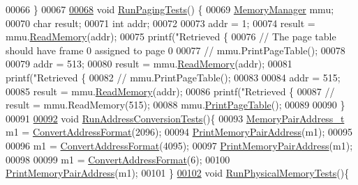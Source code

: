 \begin{DoxyCode}
00066 \}
00067 
\hypertarget{main_8cpp_source.tex_l00068}{}\hyperlink{main_8cpp_a31aaac7e09dbfca2c888cb8e319fcdbd}{00068} \textcolor{keywordtype}{void} \hyperlink{main_8cpp_a31aaac7e09dbfca2c888cb8e319fcdbd}{RunPagingTests}() \{
00069     \hyperlink{classMemoryManager}{MemoryManager} mmu;
00070     \textcolor{keywordtype}{char} result;
00071     \textcolor{keywordtype}{int} addr;
00072 
00073     addr = 1;
00074     result = mmu.\hyperlink{classMemoryManager_a4a716fc46ee321ebb25bd54bcc9d0524}{ReadMemory}(addr);
00075     printf(\textcolor{stringliteral}{"Retrieved \{%
00076     \textcolor{comment}{// The page table should have frame 0 assigned to page 0}
00077     \textcolor{comment}{// mmu.PrintPageTable();}
00078 
00079     addr = 513;
00080     result = mmu.\hyperlink{classMemoryManager_a4a716fc46ee321ebb25bd54bcc9d0524}{ReadMemory}(addr);
00081     printf(\textcolor{stringliteral}{"Retrieved \{%
00082     \textcolor{comment}{// mmu.PrintPageTable();}
00083 
00084     addr = 515;
00085     result = mmu.\hyperlink{classMemoryManager_a4a716fc46ee321ebb25bd54bcc9d0524}{ReadMemory}(addr);
00086     printf(\textcolor{stringliteral}{"Retrieved \{%
00087     \textcolor{comment}{// result = mmu.ReadMemory(515);}
00088     mmu.\hyperlink{classMemoryManager_aa7437efdc1ebd09895d451e2c521857a}{PrintPageTable}();
00089 
00090 \}
00091 
\hypertarget{main_8cpp_source.tex_l00092}{}\hyperlink{main_8cpp_a9d50d2049f7ee3c00984500c882ddde9}{00092} \textcolor{keywordtype}{void} \hyperlink{main_8cpp_a9d50d2049f7ee3c00984500c882ddde9}{RunAddressConversionTests}()\{ 
00093     \hyperlink{structMemoryPairAddress__t}{MemoryPairAddress\_t} m1 = \hyperlink{memory_8cpp_a90bdb77a86b4a78c22b50e250b77d9ad}{ConvertAddressFormat}(2096);
00094     \hyperlink{memory_8cpp_ac93b824d9e950d90189b96ba89151512}{PrintMemoryPairAddress}(m1);
00095 
00096     m1 = \hyperlink{memory_8cpp_a90bdb77a86b4a78c22b50e250b77d9ad}{ConvertAddressFormat}(4095);
00097     \hyperlink{memory_8cpp_ac93b824d9e950d90189b96ba89151512}{PrintMemoryPairAddress}(m1);
00098 
00099     m1 = \hyperlink{memory_8cpp_a90bdb77a86b4a78c22b50e250b77d9ad}{ConvertAddressFormat}(6);
00100     \hyperlink{memory_8cpp_ac93b824d9e950d90189b96ba89151512}{PrintMemoryPairAddress}(m1);
00101 \}
\hypertarget{main_8cpp_source.tex_l00102}{}\hyperlink{main_8cpp_a5aa22abf10bfd6c47d6f04571ea77f1d}{00102} \textcolor{keywordtype}{void} \hyperlink{main_8cpp_a5aa22abf10bfd6c47d6f04571ea77f1d}{RunPhysicalMemoryTests}()\{
}}}
\end{DoxyCode}
